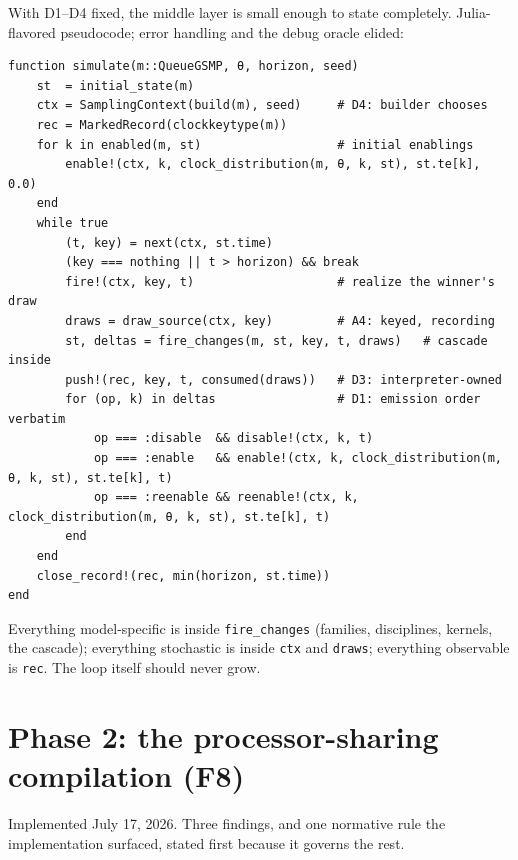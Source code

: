 \documentclass[11pt]{article}
\newcommand{\code}[1]{\texttt{#1}}
\begin{document}
With D1--D4 fixed, the middle layer is small enough to state completely.
Julia-flavored pseudocode; error handling and the debug oracle elided:

\begin{lstlisting}
function simulate(m::QueueGSMP, θ, horizon, seed)
    st  = initial_state(m)
    ctx = SamplingContext(build(m), seed)     # D4: builder chooses
    rec = MarkedRecord(clockkeytype(m))
    for k in enabled(m, st)                   # initial enablings
        enable!(ctx, k, clock_distribution(m, θ, k, st), st.te[k], 0.0)
    end
    while true
        (t, key) = next(ctx, st.time)
        (key === nothing || t > horizon) && break
        fire!(ctx, key, t)                    # realize the winner's draw
        draws = draw_source(ctx, key)         # A4: keyed, recording
        st, deltas = fire_changes(m, st, key, t, draws)   # cascade inside
        push!(rec, key, t, consumed(draws))   # D3: interpreter-owned
        for (op, k) in deltas                 # D1: emission order verbatim
            op === :disable  && disable!(ctx, k, t)
            op === :enable   && enable!(ctx, k, clock_distribution(m, θ, k, st), st.te[k], t)
            op === :reenable && reenable!(ctx, k, clock_distribution(m, θ, k, st), st.te[k], t)
        end
    end
    close_record!(rec, min(horizon, st.time))
end
\end{lstlisting}

Everything model-specific is inside \code{fire\_changes} (families,
disciplines, kernels, the cascade); everything stochastic is inside
\code{ctx} and \code{draws}; everything observable is \code{rec}. The loop
itself should never grow.

\section{Phase 2: the processor-sharing compilation (F8)}
\label{sec:ps}

Implemented July 17, 2026. Three findings, and one normative rule the
implementation surfaced, stated first because it governs the rest.
\end{document}

